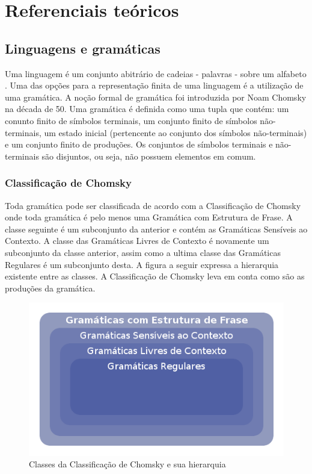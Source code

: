\part{Referenciais teóricos}

\chapter{Linguagens e gramáticas}
Uma linguagem é um conjunto abitrário de cadeias - palavras - sobre um alfabeto \cite{lang}.
Uma das opções para a representação finita de uma linguagem é a utilização de uma gramática.
A noção formal de gramática foi introduzida por Noam Chomsky na década de 50. Uma gramática é definida como uma tupla que contém: 
um conunto finito de símbolos terminais, um conjunto finito de símbolos não-terminais, um estado inicial (pertencente ao conjunto dos símbolos não-terminais) e 
um conjunto finito de produções. Os conjuntos de símbolos terminais e não-terminais são disjuntos, ou seja, não possuem elementos em comum. \cite{gram}

\section{Classificação de Chomsky}
Toda gramática pode ser classificada de acordo com a Classificação de Chomsky onde toda gramática é pelo menos uma Gramática com Estrutura de Frase. A classe seguinte é um subconjunto da anterior e contém as Gramáticas Sensíveis ao Contexto. A classe das Gramáticas Livres de Contexto é novamente um subconjunto da classe anterior, assim como a ultima classe das Gramáticas Regulares é um subconjunto desta. A figura a seguir expressa a hierarquia existente entre as classes. A Classificação de Chomsky leva em conta como são as produções da gramática.

	
\begin{figure}[H]
	\caption{\label{gram_cls}Classes da Classificação de Chomsky e sua hierarquia}
	\begin{center}
	    \includegraphics[scale=0.5]{driagrama_classes_gramaticas.png}
	\end{center}
\end{figure}

